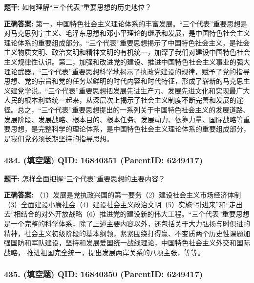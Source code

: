 \documentclass[12pt,UTF8]{ctexart}
\begin{document}
\textbf{题干:}
如何理解“三个代表”重要思想的历史地位？



\textbf{正确答案:}
第一，中国特色社会主义理论体系的丰富发展。“三个代表”重要思想是对马克思列宁主义、毛泽东思想和邓小平理论的继承和发展，是中国特色社会主义理论体系的重要组成部分。“三个代表”重要思想揭示了中国特色社会主义，是社会主义物质文明、政治文明和精神文明的有机统一，加深了我们对建设中国特色社会主义规律性认识。第二，加强和改进党的建设、推进中国特色社会主义事业的强大理论武器。“三个代表”重要思想科学地揭示了执政党建设的规律，赋予了党的指导思想、党的宗旨和党的任务以鲜明的时代内容和时代特征，形成了崭新的马克思主义建党学说。“三个代表”重要思想把发展先进生产力、发展先进文化和实现最广大人民的根本利益统一起来，从深层次上揭示了社会主义制度不断完善和发展的途径。总之，“三个代表”重要思想提出的一系列关于中国特色社会主义的发展道路、发展阶段、发展战略、根本目的、根本任务、发展动力、依靠力量、国际战略等重要思想，是完整科学的理论体系，是中国特色社会主义理论体系的重要组成部分，是我们党必须长期坚持的指导思想。

\vspace{0.3em}\hrulefill\vspace{0.7em}

\subsubsection*{434. (填空题) \small QID: 16840351 (ParentID: 6249417)}

\textbf{题干:}
怎样全面把握“三个代表”重要思想的主要内容？



\textbf{正确答案:}
（1）发展是党执政兴国的第一要务（2）建设社会主义市场经济体制（3）全面建设小康社会（4）建设社会主义政治文明（5）实施“引进来”和“走出去”相结合的对外开放战略（6）推进党的建设新的伟大工程。“三个代表”重要思想是一个完整的科学体系，除了上述主要内容以外，还包括关于大力弘扬与时俱进的精神，社会主义初级阶段的基本纲领，紧紧围绕打得赢、不变质两个历史性课题加强国防和军队建设，坚持和发展爱国统一战线理论，中国特色社会主义外交和国际战略， 推进祖国完全统一，提出发展两岸关系的八项主张，等等。

\vspace{0.3em}\hrulefill\vspace{0.7em}

\subsubsection*{435. (填空题) \small QID: 16840350 (ParentID: 6249417)}
\end{document}
